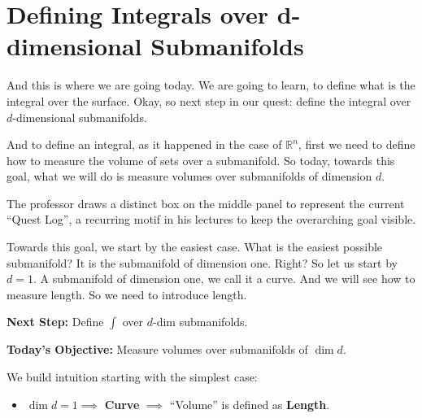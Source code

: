 
\section{Defining Integrals over d-dimensional Submanifolds}

\begin{spokenclean}[00:02:40 - 00:03:35]
And this is where we are going today. We are going to learn, to define what is the integral over the surface. Okay, so next step in our quest: define the integral over $d$-dimensional submanifolds. 

And to define an integral, as it happened in the case of $\mathbb{R}^n$, first we need to define how to measure the volume of sets over a submanifold. So today, towards this goal, what we will do is measure volumes over submanifolds of dimension $d$. 
\end{spokenclean}

\begin{nicebox}
The professor draws a distinct box on the middle panel to represent the current ``Quest Log'', a recurring motif in his lectures to keep the overarching goal visible.
\end{nicebox}

\begin{spokenclean}[00:03:35 - 00:04:20]
Towards this goal, we start by the easiest case. What is the easiest possible submanifold? It is the submanifold of dimension one. Right? So let us start by $d=1$. A submanifold of dimension one, we call it a curve. And we will see how to measure length. So we need to introduce length.
\end{spokenclean}

\begin{mathstroke}
\textbf{Next Step:} Define $\int$ over $d$-dim submanifolds.

\textbf{Today's Objective:} Measure volumes over submanifolds of $\dim d$.

We build intuition starting with the simplest case:
\begin{itemize}
    \item $\dim d = 1 \implies$ \textbf{Curve} $\implies$ ``Volume'' is defined as \textbf{Length}.
\end{itemize}
\end{mathstroke}

